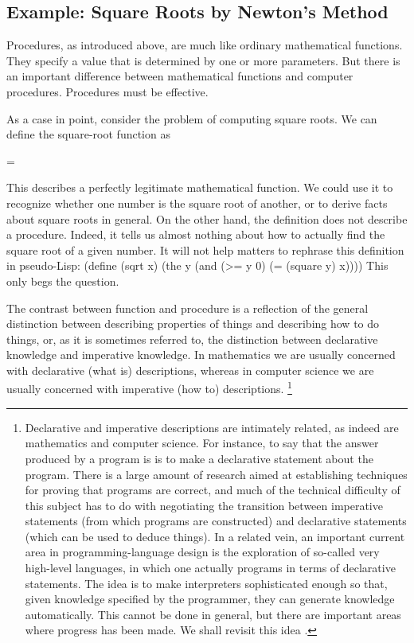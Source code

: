 \subsection{Example: Square Roots by Newton's Method}

Procedures, as introduced above, are much like ordinary mathematical functions.
They specify a value that is determined by one or more parameters.
But there is an important difference between mathematical functions and computer procedures.
Procedures must be effective.

As a case in point, consider the problem of computing square roots. We can define the square-root function as

\startformula
   =
\stopformula

This describes a perfectly legitimate mathematical function.
We could use it to recognize whether one number is the square root of another,
or to derive facts about square roots in general.
On the other hand, the definition does not describe a procedure.
Indeed, it tells us almost nothing about how to actually find the square root of a given number.
It will not help matters to rephrase this definition in pseudo-Lisp:
\startcode
(define (sqrt x)
  (the y (and (>= y 0)
              (= (square y) x))))
\stopcode
This only begs the question.

The contrast between function and procedure is a reflection of the general distinction
between describing properties of things and describing how to do things,
or, as it is sometimes referred to,
the distinction between declarative knowledge and imperative knowledge.
In mathematics we are usually concerned with declarative (what is) descriptions,
whereas in computer science we are usually concerned with imperative (how to) descriptions.
\footnote{%
   Declarative and imperative descriptions are intimately related,
   as indeed are mathematics and computer science.
   For instance,
   to say that the answer produced by a program is 
   is to make a declarative statement about the program.
   There is a large amount of research aimed at establishing techniques for proving that programs are correct,
   and much of the technical difficulty of this subject has to do with negotiating the transition
   between imperative statements
   (from which programs are constructed)
   and declarative statements (which can be used to deduce things).
   In a related vein,
   an important current area in programming-language design
   is the exploration of so-called very high-level languages,
   in which one actually programs in terms of declarative statements.
   The idea is to make interpreters sophisticated enough so that,
   given  knowledge specified by the programmer,
   they can generate  knowledge automatically.
   This cannot be done in general,
   but there are important areas where progress has been made.
   We shall revisit this idea .
}

